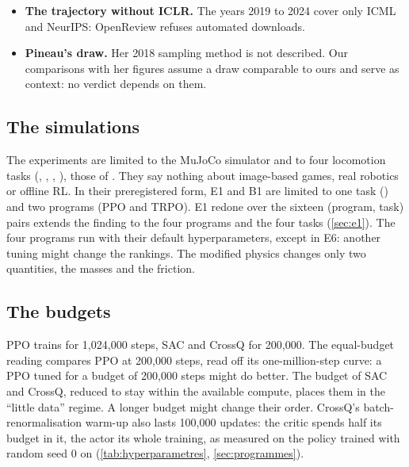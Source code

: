 \begin{itemize}
        (, \cref{sec:sr-robustesse}). The asymmetry of versions is
        real, but it changes only four to six of the 48 papers of 2018: it explains part of the gap
        between our 2018 Q5 and Pineau's, not the verdict.
  \item \textbf{The trajectory without ICLR.} The years 2019 to 2024 cover only ICML and NeurIPS:
        OpenReview refuses automated downloads.
  \item \textbf{Pineau's draw.} Her 2018 sampling method is not described. Our comparisons with her
        figures assume a draw comparable to ours and serve as context: no verdict depends on them.
\end{itemize}

\subsection{The simulations}

The experiments are limited to the MuJoCo simulator and to four locomotion tasks
(, , , ), those of
\textcite{henderson2018matters}. They say nothing about image-based games, real robotics or offline
RL. In their preregistered form, E1 and B1 are limited to one task () and two
programs (PPO and TRPO). E1 redone over the sixteen (program, task) pairs extends the finding to
the four programs and the four tasks (\cref{sec:e1}). The four programs run with their
default hyperparameters, except in E6: another tuning might change the rankings. The modified
physics changes only two quantities, the masses and the friction.

\subsection{The budgets}

PPO trains for 1{,}024{,}000 steps, SAC and CrossQ for 200{,}000.
The equal-budget reading compares PPO at 200{,}000 steps, read off its
one-million-step curve: a PPO tuned for a budget of 200{,}000 steps might do better. The budget of
SAC and CrossQ, reduced to stay within the available compute, places them in the \enquote{little data}
regime. A longer budget might change their order. CrossQ's batch-renormalisation warm-up also lasts
100{,}000 updates: the critic spends half its budget in it, the actor its whole training, as
measured on the policy trained with random seed 0 on  (\cref{tab:hyperparametres},
\cref{sec:programmes}).

